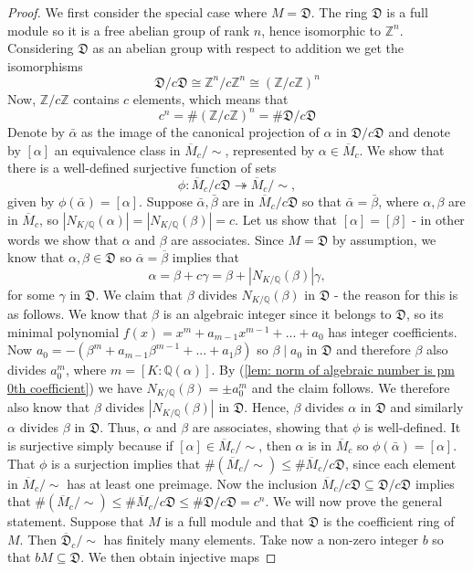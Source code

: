 \documentclass{article}
\newcommand{\mfrak}[1]{\mathfrak{#1}}
\newcommand{\mbb}[1]{\mathbb{#1}}
\begin{document}
\begin{proof}
We first consider the special case where $M = \mfrak D$. The ring $\mfrak D$ is a full module so it is a free abelian group of rank $n$, hence isomorphic to $\mbb Z^n$. Considering $\mfrak D$ as an abelian group with respect to addition we get the isomorphisms
$$\mfrak D/c \mfrak D \cong \mbb Z^n/c \mbb Z^n \cong (\mbb Z/c \mbb Z)^n$$
Now, $\mbb Z / c \mbb Z$ contains $c$ elements, which means that 
$$c^n = \# (\mbb Z/c \mbb Z)^n = \# \mfrak D/c \mfrak D$$
Denote by $\bar \alpha$ as the image of the canonical projection of $\alpha$ in $\mfrak D/c \mfrak D$ and denote by $[\alpha]$ an equivalence class in $\overline M_c / \sim$, represented by $\alpha \in \overline M_c$. We show that there is a well-defined surjective function of sets 
$$\phi : \overline M_c /c \mfrak D \twoheadrightarrow  \overline M_c / \sim,$$
given by $\phi(\bar \alpha) = [\alpha]$. Suppose $\bar \alpha, \bar \beta$ are in $\overline M_c /c \mfrak D$ so that $\bar \alpha = \bar \beta$, where $\alpha, \beta$ are in $\overline M_c$, so $|N_{K/\mbb Q}(\alpha)| = |N_{K/\mbb Q}(\beta)| = c$. Let us show that $[\alpha] = [\beta]$ - in other words we show that $\alpha$ and $\beta$ are associates. Since $M = \mfrak D$ by assumption, we know that $\alpha, \beta \in \mfrak D$ so $\overline \alpha = \overline \beta$ implies that
$$\alpha = \beta + c \gamma = \beta + |N_{K/\mbb Q}(\beta)| \gamma,$$
for some $\gamma$ in $\mfrak D$. We claim that $\beta$ divides $N_{K/\mbb Q}(\beta)$ in $\mathfrak D$ - the reason for this is as follows. We know that $\beta$ is an algebraic integer since it belongs to $\mfrak D$, so its minimal polynomial $f(x) = x^m + a_{m-1}x^{m-1} + ... + a_0$ has integer coefficients. Now $a_0 = -(\beta^m + a_{m-1}\beta^{m-1} + ... + a_1\beta)$ so $\beta \mid a_0$ in $\mfrak D$ and therefore $\beta$ also divides $a_0^m$, where $m = [K : \mbb Q(\alpha)]$. By (\ref{lem: norm of algebraic number is pm 0th coefficient}) we have $N_{K/\mbb Q}(\beta) = \pm a_0^m$ and the claim follows. We therefore also know that $\beta$ divides $|N_{K/\mbb Q}(\beta)|$ in $\mfrak D$. Hence, $\beta$ divides $\alpha$ in $\mfrak D$ and similarly $\alpha$ divides $\beta$ in $\mfrak D$. Thus, $\alpha$ and $\beta$ are associates, showing that $\phi$ is well-defined. It is surjective simply because if $[\alpha] \in \overline M_c / \sim$, then $\alpha$ is in $\overline M_c$ so $\phi(\bar \alpha) = [\alpha]$. That $\phi$ is a surjection implies that $\# (\overline M_c / \sim) \leq \# \overline M_c / c \mfrak D$, since each element in $\overline M_c /\sim$ has at least one preimage. Now the inclusion $\overline M_c / c \mfrak D \subseteq \mfrak D / c \mfrak D$ implies that $\# (\overline M_c / \sim) \leq \# \overline M_c / c \mfrak D \leq \# \mfrak D / c \mfrak D = c^n$. We will now prove the general statement. Suppose that $M$ is a full module and that $\mfrak D$ is the coefficient ring of $M$. Then $\overline {\mfrak{D}}_c / \sim$ has finitely many elements. Take now a non-zero integer $b$ so that $bM \subseteq \mfrak D$. We then obtain injective maps

\end{proof}
\end{document}
